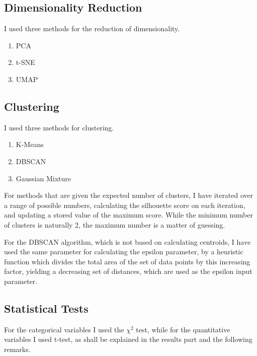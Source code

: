 \documentclass{article}
\begin{document}
\subsection{Dimensionality Reduction}
I used three methods for the reduction of dimensionality.
\begin{enumerate}
    \item PCA
    \item t-SNE
    \item UMAP
\end{enumerate}

\subsection{Clustering}
I used three methods for clustering.
\begin{enumerate}
    \item K-Means
    \item DBSCAN
    \item Gaussian Mixture
\end{enumerate}

For methods that are given the expected number of clusters, I have iterated over a range of possible numbers, calculating the silhouette score on each iteration, and updating a stored value of the maximum score. While the minimum number of clusters is naturally 2, the maximum number is a matter of guessing.

For the DBSCAN algorithm, which is not based on calculating centroids, I have used the same parameter for calculating the epsilon parameter, by a heuristic function which divides the total area of the set of data points by this increasing factor, yielding a decreasing set of distances, which are used as the epsilon input parameter.

\subsection{Statistical Tests}
For the categorical variables I used the $\chi^2$ test, while for the quantitative variables I used t-test, as shall be explained in the results part and the following remarks. 
\end{document}
